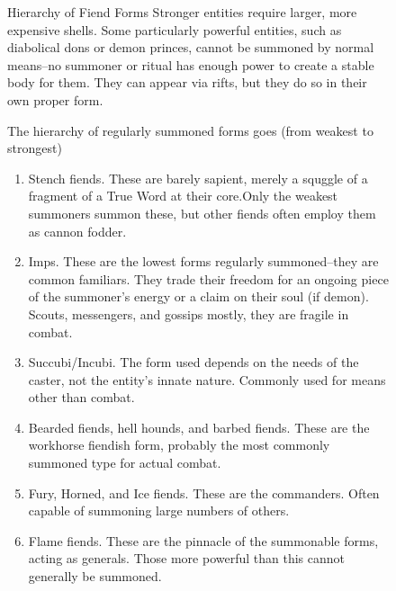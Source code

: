 \begin{figure}
	\begin{DndComment}{Hierarchy of Fiend Forms}
		Stronger entities require larger, more expensive shells. Some particularly powerful entities, such as diabolical dons or demon princes, cannot be summoned by normal means--no summoner or ritual has enough power to create a stable body for them. They can appear via rifts, but they do so in their own proper form.

		The hierarchy of regularly summoned forms goes (from weakest to strongest)
		\begin{enumerate}
			\item Stench fiends. These are barely sapient, merely a squggle of a fragment of a True Word at their core.Only the weakest summoners summon these, but other fiends often employ them as cannon fodder.
			\item Imps. These are the lowest forms regularly summoned--they are common familiars. They trade their freedom for an ongoing piece of the summoner's energy or a claim on their soul (if demon). Scouts, messengers, and gossips mostly, they are fragile in combat.
			\item Succubi/Incubi. The form used depends on the needs of the caster, not the entity's innate nature. Commonly used for means other than combat.
			\item Bearded fiends, hell hounds, and barbed fiends. These are the workhorse fiendish form, probably the most commonly summoned type for actual combat.
			\item Fury, Horned, and Ice fiends. These are the commanders. Often capable of summoning large numbers of others.
			\item Flame fiends. These are the pinnacle of the summonable forms, acting as generals. Those more powerful than this cannot generally be summoned.
		\end{enumerate}
	\end{DndComment}
\end{figure}


